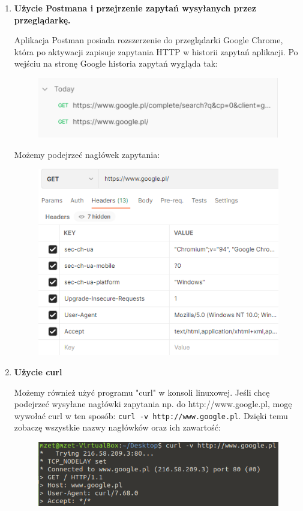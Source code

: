 \documentclass{article}
\begin{document}
		\begin{enumerate}
			\item \textbf{Użycie Postmana i przejrzenie zapytań wysyłanych przez przeglądarkę.} 
			
			Aplikacja Postman posiada rozszerzenie do przeglądarki Google Chrome, która po aktywacji zapisuje zapytania HTTP w historii zapytań aplikacji. Po wejściu na stronę Google historia zapytań wygląda tak:
			\begin{figure}[h!]
				\includegraphics[width=1\textwidth]{googlehttp}
			\end{figure}
			\clearpage
			Możemy podejrzeć nagłówek zapytania:
			\begin{figure}[h!]
				\includegraphics[width=1\textwidth]{googlehttpdetails}
			\end{figure}
			
			\item \textbf{Użycie curl}
			
			Możemy również użyć programu "curl" w konsoli linuxowej. Jeśli chcę podejrzeć wysyłane nagłówki zapytania np. do http://www.google.pl, mogę wywołać curl w ten sposób: \texttt{curl -v http://www.google.pl}.
			Dzięki temu zobaczę wszystkie nazwy nagłówków oraz ich zawartość:
			\begin{figure}[h!]
				\includegraphics[width=1\textwidth]{curlhttp}
			\end{figure}
		

\end{enumerate}
\end{document}

